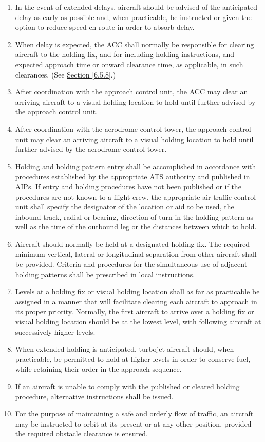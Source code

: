 \begin{enumerate}
    \item In the event of extended delays, aircraft should be advised of the anticipated delay as early as possible and, when practicable, be instructed or given the option to reduce speed en route in order to absorb delay.
    \item When delay is expected, the ACC shall normally be responsible for clearing aircraft to the holding fix, and for including holding instructions, and expected approach time or onward clearance time, as applicable, in such clearances. (See \hyperref[6.5.8]{Section \ref{6.5.8}}.)
    \item After coordination with the approach control unit, the ACC may clear an arriving aircraft to a visual holding location to hold until further advised by the approach control unit.
    \item After coordination with the aerodrome control tower, the approach control unit may clear an arriving aircraft to a visual holding location to hold until further advised by the aerodrome control tower.
    \item Holding and holding pattern entry shall be accomplished in accordance with procedures established by the appropriate ATS authority and published in AIPs. If entry and holding procedures have not been published or if the procedures are not known to a flight crew, the appropriate air traffic control unit shall specify the designator of the location or aid to be used, the inbound track, radial or bearing, direction of turn in the holding pattern as well as the time of the outbound leg or the distances between which to hold.
    \item Aircraft should normally be held at a designated holding fix. The required minimum vertical, lateral or longitudinal separation from other aircraft shall be provided. Criteria and procedures for the simultaneous use of adjacent holding patterns shall be prescribed in local instructions.
    \item Levels at a holding fix or visual holding location shall as far as practicable be assigned in a manner that will facilitate clearing each aircraft to approach in its proper priority. Normally, the first aircraft to arrive over a holding fix or visual holding location should be at the lowest level, with following aircraft at successively higher levels.
    \item When extended holding is anticipated, turbojet aircraft should, when practicable, be permitted to hold at higher levels in order to conserve fuel, while retaining their order in the approach sequence.
    \item If an aircraft is unable to comply with the published or cleared holding procedure, alternative instructions shall be issued.
    \item For the purpose of maintaining a safe and orderly flow of traffic, an aircraft may be instructed to orbit at its present or at any other position, provided the required obstacle clearance is ensured.
\end{enumerate}

